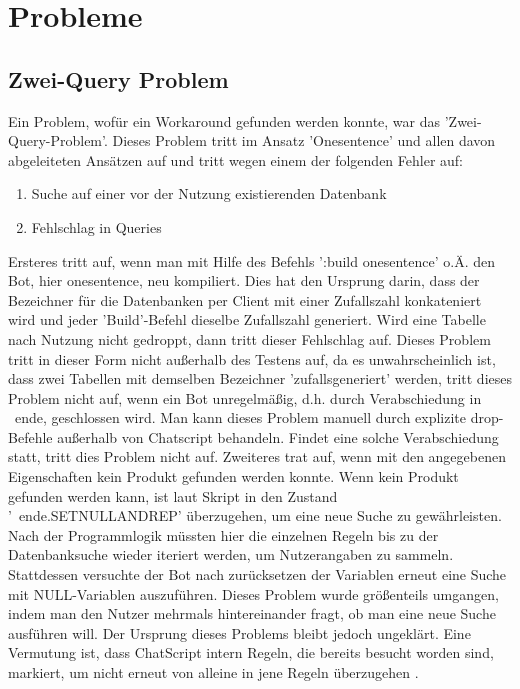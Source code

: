 \chapter{Probleme}
\label{sec:Probleme}


\section{Zwei-Query Problem}
\label{Section: Zwei-Query Problem}

Ein Problem, wofür ein Workaround gefunden werden konnte, war das 'Zwei-Query-Problem'. Dieses Problem tritt im Ansatz 'Onesentence' und allen davon abgeleiteten Ansätzen auf und tritt wegen einem der folgenden Fehler auf:

\begin{enumerate}
\item Suche auf einer vor der Nutzung existierenden Datenbank
\item Fehlschlag in Queries
\end{enumerate}  

Ersteres tritt auf, wenn man mit Hilfe des Befehls ':build onesentence' o.Ä. den Bot, hier onesentence, neu kompiliert. Dies hat den Ursprung darin, dass der Bezeichner für die Datenbanken per Client mit einer Zufallszahl konkateniert wird und jeder 'Build'-Befehl dieselbe Zufallszahl generiert. Wird eine Tabelle nach Nutzung nicht gedroppt, dann tritt dieser Fehlschlag auf. Dieses Problem tritt in dieser Form nicht außerhalb des Testens auf, da es unwahrscheinlich ist, dass zwei Tabellen mit demselben Bezeichner 'zufallsgeneriert' werden, tritt dieses Problem nicht auf, wenn ein Bot unregelmäßig, d.h. durch Verabschiedung in ~ende, geschlossen wird. Man kann dieses Problem manuell durch explizite drop-Befehle außerhalb von Chatscript behandeln. Findet eine solche Verabschiedung statt, tritt dies Problem nicht auf. 
Zweiteres trat auf, wenn mit den angegebenen Eigenschaften kein Produkt gefunden werden konnte. Wenn kein Produkt gefunden werden kann, ist laut Skript in den Zustand '~ende.SETNULLANDREP' überzugehen, um eine neue Suche zu gewährleisten. Nach der Programmlogik müssten hier die einzelnen Regeln bis zu der Datenbanksuche wieder iteriert werden, um Nutzerangaben zu sammeln. Stattdessen versuchte der Bot nach zurücksetzen der Variablen erneut eine Suche mit NULL-Variablen auszuführen. Dieses Problem wurde größenteils umgangen, indem man den Nutzer mehrmals hintereinander fragt, ob man eine neue Suche ausführen will. Der Ursprung dieses Problems bleibt jedoch ungeklärt. Eine Vermutung ist, dass ChatScript intern Regeln, die bereits besucht worden sind, markiert, um nicht erneut von alleine in jene Regeln überzugehen \cite{chatscript2019}.

